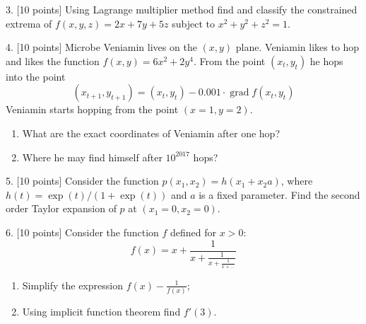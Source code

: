 \documentclass[12pt,a4paper]{article}
\DeclareMathOperator{\grad}{grad}
\begin{document}
3. {[10 points]} Using Lagrange multiplier method find and classify the constrained extrema of $f(x, y, z) =  2x +7y + 5z$ subject to $x^2 + y^2 + z^2 = 1$.




\newpage
{}

4. {[10 points]} Microbe Veniamin lives on the $(x, y)$ plane. Veniamin likes to hop and likes the function $f(x, y) = 6x^2 + 2y^4$. From the point $(x_t, y_t)$ he hops into the point
\[
(x_{t+1},y_{t+1})=(x_t, y_t) - 0.001\cdot \grad f(x_t, y_t)
\]
Veniamin starts hopping from the point $(x=1, y =2)$.

\begin{enumerate}
  \item What are the exact coordinates of Veniamin after one hop?
  \item Where he may find himself after $10^{2017}$ hops?
\end{enumerate}


\newpage
{}

5. {[10 points]} Consider the function $p(x_1, x_2) = h(x_1 + x_2 a)$, where $h(t) = \exp(t)/(1+\exp(t))$ and $a$ is a fixed parameter. Find the second order Taylor expansion of $p$ at $(x_1=0, x_2=0)$.

\newpage
{}

6. {[10 points]} Consider the function $f$ defined for $x>0$:
\[
f(x) = x + \frac{1}{x + \frac{1}{x + \frac{1}{x + \ldots}}}
\]
\begin{enumerate}
  \item Simplify the expression $f(x) - \frac{1}{f(x)}$;
  \item Using implicit function theorem find $f'(3)$.
\end{enumerate}
\end{document}
